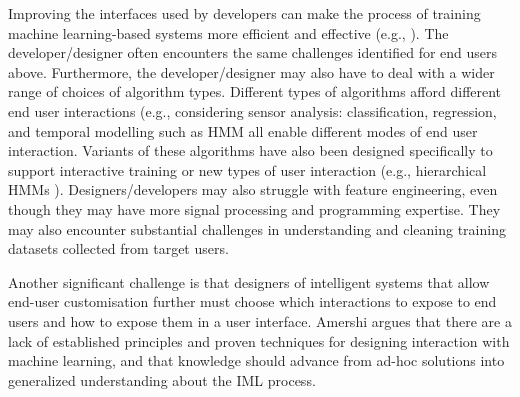 \documentclass[letterpaper]{article}
\begin{document}
Improving the interfaces used by developers can make the process of training machine learning-based systems more efficient and effective (e.g., \cite{patel2010gestalt,amershi2015modeltracker}). The developer/designer often encounters the same challenges identified for end users above. Furthermore, the developer/designer may also have to deal with a wider range of choices of algorithm types. Different types of algorithms afford different end user interactions (e.g., considering sensor analysis: classification, regression, and temporal modelling such as HMM all enable different modes of end user interaction. Variants of these algorithms have also been designed specifically to support interactive training or new types of user interaction (e.g., hierarchical HMMs \cite{franccoise2014probabilistic}). Designers/developers may also struggle with feature engineering, even though they may have more signal processing and programming expertise. They may also encounter substantial challenges in understanding and cleaning training datasets collected from target users. 

Another significant challenge is that designers of intelligent systems that allow end-user customisation further must choose which interactions to expose to end users and how to expose them in a user interface. Amershi \citeyear{Amershi2012} argues that there are a lack of established principles and proven techniques for designing interaction with machine learning, and that knowledge should advance from ad-hoc solutions into generalized understanding about the IML process.

\end{document}
